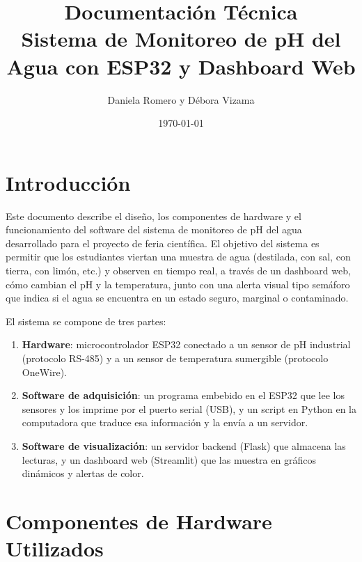 \documentclass[11pt,a4paper]{article}
\title{
    \Large \textbf{Documentación Técnica} \\
    \large Sistema de Monitoreo de pH del Agua con ESP32 y Dashboard Web
}
\author{Daniela Romero y Débora Vizama}
\date{\today}
\begin{document}
\maketitle
\thispagestyle{empty}
\tableofcontents
\newpage

\section{Introducción}

Este documento describe el diseño, los componentes de hardware y el
funcionamiento del software del sistema de monitoreo de pH del agua
desarrollado para el proyecto de feria científica. El objetivo del
sistema es permitir que los estudiantes viertan una muestra de agua
(destilada, con sal, con tierra, con limón, etc.) y observen en tiempo
real, a través de un dashboard web, cómo cambian el pH y la
temperatura, junto con una alerta visual tipo semáforo que indica si
el agua se encuentra en un estado seguro, marginal o contaminado.

El sistema se compone de tres partes:

\begin{enumerate}
    \item \textbf{Hardware}: microcontrolador ESP32 conectado a un
    sensor de pH industrial (protocolo RS-485) y a un sensor de
    temperatura sumergible (protocolo OneWire).
    \item \textbf{Software de adquisición}: un programa embebido en
    el ESP32 que lee los sensores y los imprime por el puerto serial
    (USB), y un script en Python en la computadora que traduce esa
    información y la envía a un servidor.
    \item \textbf{Software de visualización}: un servidor backend
    (Flask) que almacena las lecturas, y un dashboard web
    (Streamlit) que las muestra en gráficos dinámicos y alertas de
    color.
\end{enumerate}

\section{Componentes de Hardware Utilizados}
\end{document}
